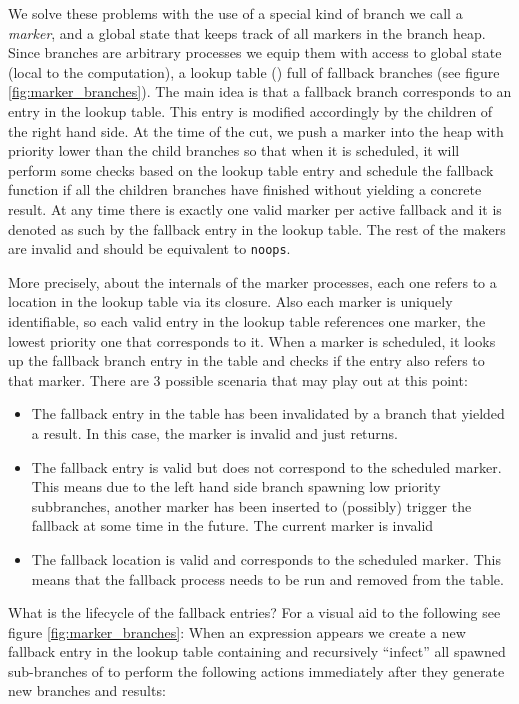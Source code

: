 We solve these problems with the use of a special kind of branch we
call a \emph{marker}, and a global state that keeps track of all
markers in the branch heap. Since branches are arbitrary processes we
equip them with access to global state (local to the computation), a
lookup table () full of fallback branches (see figure
\ref{fig:marker_branches}).  The main idea is that a fallback branch
corresponds to an entry in the lookup table. This entry is modified
accordingly by the children of the right hand side. At the time of the
cut, we push a marker into the heap with priority lower than the child
branches so that when it is scheduled, it will perform some checks
based on the lookup table entry and schedule the fallback function if
all the children branches have finished without yielding a concrete
result. At any time there is exactly one valid marker per active
fallback and it is denoted as such by the fallback entry in the lookup
table. The rest of the makers are invalid and should be equivalent to
\texttt{noops}.

More precisely, about the internals of the marker processes, each one
refers to a location in the lookup table via its closure. Also each
marker is uniquely identifiable, so each valid entry in the lookup
table references one marker, the lowest priority one that corresponds
to it. When a marker is scheduled, it looks up the fallback branch
entry in the table and checks if the entry also refers to that
marker. There are 3 possible scenaria that may play out at this point:

\begin{itemize}
\item The fallback entry in the table has been invalidated by a branch
  that yielded a result. In this case, the marker is invalid and just
  returns.
\item The fallback entry is valid but does not correspond to the
  scheduled marker. This means due to the left hand side branch
  spawning low priority subbranches, another marker has been inserted
  to (possibly) trigger the fallback at some time in the future. The
  current marker is invalid
\item The fallback location is valid and corresponds to the scheduled
  marker. This means that the fallback process needs to be run
  and removed from the table.
\end{itemize}

What is the lifecycle of the fallback entries? For a visual aid to the
following see figure \ref{fig:marker_branches}: When an expression
 appears we create a new fallback entry in the lookup
table containing  and recursively ``infect'' all spawned
sub-branches of  to perform the following actions immediately
after they generate new branches and results:

